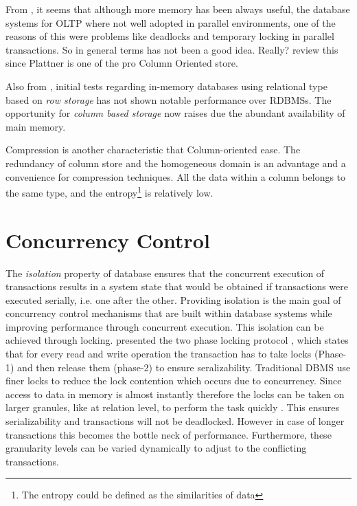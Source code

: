 \documentclass[12pt]{article} %
\begin{document}
From \cite{Plattner}, it seems that although more memory has been always useful, the database systems for OLTP where not well adopted in parallel environments, one of the reasons of this were problems like deadlocks and temporary locking in parallel transactions. So in general terms has not been a good idea. Really? review this since Plattner is one of the pro Column Oriented store.

Also from \cite{Plattner}, initial tests regarding in-memory databases using relational type based on \emph{ row storage } has not shown notable performance over RDBMSs. The opportunity for \emph{column based storage} now raises due the abundant availability of main memory. 

Compression is another characteristic that Column-oriented ease. The redundancy of column store and the homogeneous domain is an advantage and a convenience for compression techniques. All the data within a column belongs to the same type, and the entropy\footnote{The entropy could be defined as the similarities of data} is relatively low. 


\section{Concurrency Control}
The \emph{isolation} property of database ensures that the concurrent execution of transactions results in a system state that would be obtained if transactions were executed serially, i.e. one after the other. Providing isolation is the main goal of concurrency control mechanisms that are built within database systems while improving performance through concurrent execution. This isolation can be achieved through locking. \citeauthor{gray1993transaction} presented the two phase locking protocol \cite{gray1993transaction}, which states that for every read and write operation the transaction has to take locks (Phase-1) and then release them (phase-2) to ensure seralizability. Traditional DBMS use finer locks to reduce the lock contention which occurs due to concurrency. Since access to data in memory is almost instantly therefore the locks can be taken on larger granules, like at relation level, to perform the task quickly \cite{garcia1992main}. This ensures serializability and transactions will not be deadlocked. However in case of longer transactions this becomes the bottle neck of performance. Furthermore, these granularity levels can be varied dynamically to adjust to the conflicting transactions\cite{lehman1989concurrency}.
\end{document}
